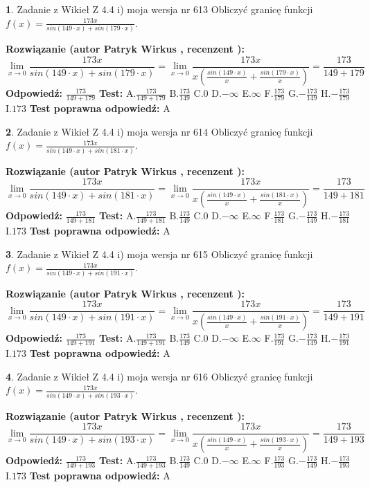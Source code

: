\documentclass[12pt, a4paper]{article}
\theoremstyle{definition} %
\newtheorem{zad}{}
\newcommand{\zadStart}[1]{\begin{zad}#1\newline}
\newcommand{\zadStop}{\end{zad}}
\newcommand{\rozwStart}[2]{\noindent \textbf{Rozwiązanie (autor #1 , recenzent #2): }\newline}
\newcommand{\rozwStop}{\newline}
\newcommand{\odpStart}{\noindent \textbf{Odpowiedź:}\newline}
\newcommand{\odpStop}{\newline}
\newcommand{\testStart}{\noindent \textbf{Test:}\newline}
\newcommand{\testStop}{\newline}
\newcommand{\kluczStart}{\noindent \textbf{Test poprawna odpowiedź:}\newline}
\newcommand{\kluczStop}{\newline}
\begin{document}
\zadStart{Zadanie z Wikieł Z 4.4 i) moja wersja nr 613}
Obliczyć granicę funkcji $f(x)=\frac{173x}{sin(149\cdot x) +sin(179\cdot x)}$.
\zadStop
\rozwStart{Patryk Wirkus}{}
$$\lim\limits_{x\to 0}\frac{173x}{sin(149\cdot x) +sin(179\cdot x)}=\lim\limits_{x\to 0}\frac{173x}{x(\frac{sin(149\cdot x)}{x}+\frac{sin(179\cdot x)}{x})}=\frac{173}{149+179}$$
\rozwStop
\odpStart
$\frac{173}{149+179}$
\odpStop
\testStart
A.$\frac{173}{149+179}$
B.$\frac{173}{149}$
C.$0$
D.$-\infty$
E.$\infty$
F.$\frac{173}{179}$
G.$-\frac{173}{149}$
H.$-\frac{173}{179}$
I.$173$
\testStop
\kluczStart
A
\kluczStop



\zadStart{Zadanie z Wikieł Z 4.4 i) moja wersja nr 614}
Obliczyć granicę funkcji $f(x)=\frac{173x}{sin(149\cdot x) +sin(181\cdot x)}$.
\zadStop
\rozwStart{Patryk Wirkus}{}
$$\lim\limits_{x\to 0}\frac{173x}{sin(149\cdot x) +sin(181\cdot x)}=\lim\limits_{x\to 0}\frac{173x}{x(\frac{sin(149\cdot x)}{x}+\frac{sin(181\cdot x)}{x})}=\frac{173}{149+181}$$
\rozwStop
\odpStart
$\frac{173}{149+181}$
\odpStop
\testStart
A.$\frac{173}{149+181}$
B.$\frac{173}{149}$
C.$0$
D.$-\infty$
E.$\infty$
F.$\frac{173}{181}$
G.$-\frac{173}{149}$
H.$-\frac{173}{181}$
I.$173$
\testStop
\kluczStart
A
\kluczStop



\zadStart{Zadanie z Wikieł Z 4.4 i) moja wersja nr 615}
Obliczyć granicę funkcji $f(x)=\frac{173x}{sin(149\cdot x) +sin(191\cdot x)}$.
\zadStop
\rozwStart{Patryk Wirkus}{}
$$\lim\limits_{x\to 0}\frac{173x}{sin(149\cdot x) +sin(191\cdot x)}=\lim\limits_{x\to 0}\frac{173x}{x(\frac{sin(149\cdot x)}{x}+\frac{sin(191\cdot x)}{x})}=\frac{173}{149+191}$$
\rozwStop
\odpStart
$\frac{173}{149+191}$
\odpStop
\testStart
A.$\frac{173}{149+191}$
B.$\frac{173}{149}$
C.$0$
D.$-\infty$
E.$\infty$
F.$\frac{173}{191}$
G.$-\frac{173}{149}$
H.$-\frac{173}{191}$
I.$173$
\testStop
\kluczStart
A
\kluczStop



\zadStart{Zadanie z Wikieł Z 4.4 i) moja wersja nr 616}
Obliczyć granicę funkcji $f(x)=\frac{173x}{sin(149\cdot x) +sin(193\cdot x)}$.
\zadStop
\rozwStart{Patryk Wirkus}{}
$$\lim\limits_{x\to 0}\frac{173x}{sin(149\cdot x) +sin(193\cdot x)}=\lim\limits_{x\to 0}\frac{173x}{x(\frac{sin(149\cdot x)}{x}+\frac{sin(193\cdot x)}{x})}=\frac{173}{149+193}$$
\rozwStop
\odpStart
$\frac{173}{149+193}$
\odpStop
\testStart
A.$\frac{173}{149+193}$
B.$\frac{173}{149}$
C.$0$
D.$-\infty$
E.$\infty$
F.$\frac{173}{193}$
G.$-\frac{173}{149}$
H.$-\frac{173}{193}$
I.$173$
\testStop
\kluczStart
A
\kluczStop
\end{document}
